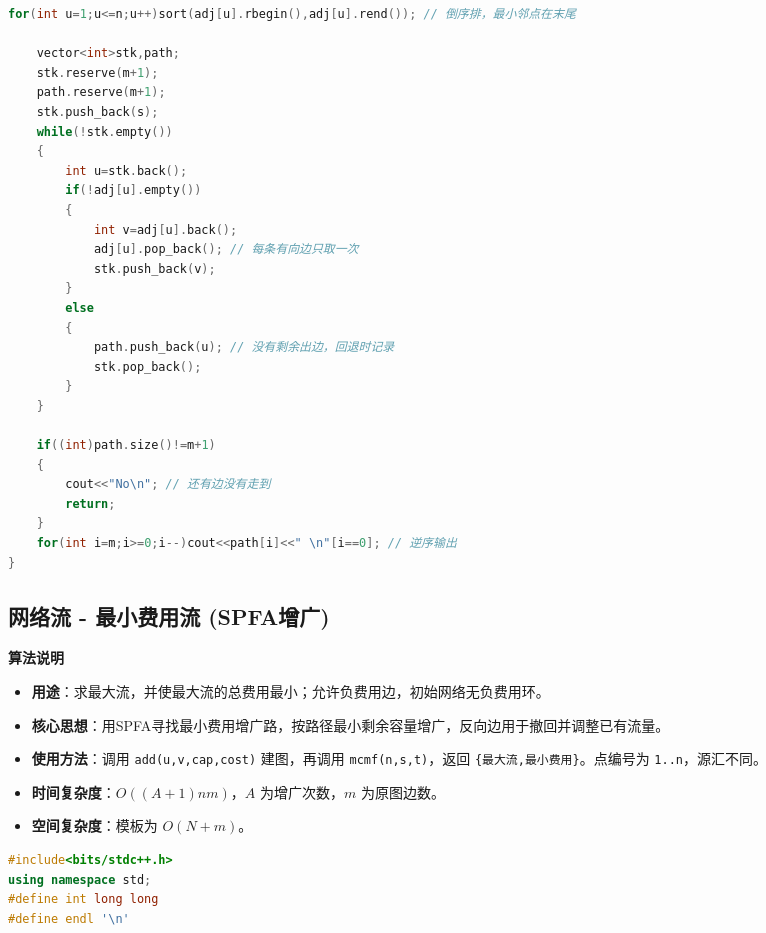 \documentclass[10pt,landscape,a4paper]{article}
\begin{document}
\begin{multicols*}{3}
\begin{lstlisting}[language=C++]
    for(int u=1;u<=n;u++)sort(adj[u].rbegin(),adj[u].rend()); // 倒序排，最小邻点在末尾

    vector<int>stk,path;
    stk.reserve(m+1);
    path.reserve(m+1);
    stk.push_back(s);
    while(!stk.empty())
    {
        int u=stk.back();
        if(!adj[u].empty())
        {
            int v=adj[u].back();
            adj[u].pop_back(); // 每条有向边只取一次
            stk.push_back(v);
        }
        else
        {
            path.push_back(u); // 没有剩余出边，回退时记录
            stk.pop_back();
        }
    }

    if((int)path.size()!=m+1)
    {
        cout<<"No\n"; // 还有边没有走到
        return;
    }
    for(int i=m;i>=0;i--)cout<<path[i]<<" \n"[i==0]; // 逆序输出
}
\end{lstlisting}
\subsection*{网络流 - 最小费用流 (SPFA增广)}
\par\addvspace{0.7ex}\noindent\textbf{算法说明}\par\nobreak
\begin{itemize}
\item \textbf{用途}：求最大流，并使最大流的总费用最小；允许负费用边，初始网络无负费用环。
\item \textbf{核心思想}：用SPFA寻找最小费用增广路，按路径最小剩余容量增广，反向边用于撤回并调整已有流量。
\item \textbf{使用方法}：调用 \texttt{a\allowbreak{}d\allowbreak{}d\allowbreak{}(\allowbreak{}u\allowbreak{},\allowbreak{}v\allowbreak{},\allowbreak{}c\allowbreak{}a\allowbreak{}p\allowbreak{},\allowbreak{}c\allowbreak{}o\allowbreak{}s\allowbreak{}t\allowbreak{})} 建图，再调用 \texttt{m\allowbreak{}c\allowbreak{}m\allowbreak{}f\allowbreak{}(\allowbreak{}n\allowbreak{},\allowbreak{}s\allowbreak{},\allowbreak{}t\allowbreak{})}，返回 \texttt{\{\allowbreak{}最\allowbreak{}大\allowbreak{}流\allowbreak{},\allowbreak{}最\allowbreak{}小\allowbreak{}费\allowbreak{}用\allowbreak{}\}}。点编号为 \texttt{1\allowbreak{}.\allowbreak{}.\allowbreak{}n}，源汇不同。
\item \textbf{时间复杂度}：$O((A+1)nm)$，$A$ 为增广次数，$m$ 为原图边数。
\item \textbf{空间复杂度}：模板为 $O(N+m)$。
\end{itemize}
\par{}\par
\begin{lstlisting}[language=C++]
#include<bits/stdc++.h>
using namespace std;
#define int long long
#define endl '\n'


\end{lstlisting}
\end{multicols*}
\end{document}
